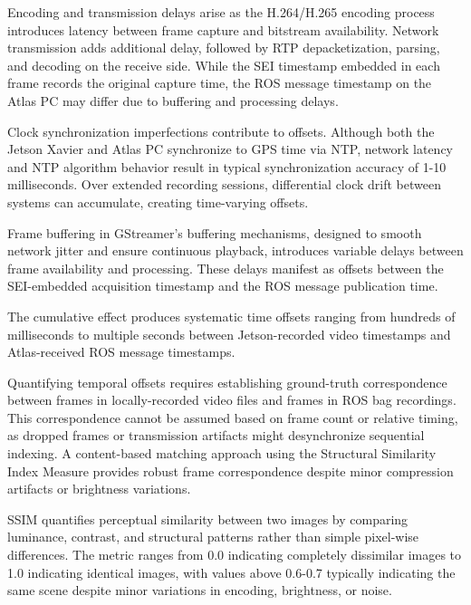 \documentclass{erauthesis}
\begin{document}
Encoding and transmission delays arise as the H.264/H.265 encoding process introduces latency between frame capture and bitstream availability.
Network transmission adds additional delay, followed by RTP depacketization, parsing, and decoding on the receive side.
While the SEI timestamp embedded in each frame records the original capture time, the ROS message timestamp on the Atlas PC may differ due to buffering and processing delays.

Clock synchronization imperfections contribute to offsets.
Although both the Jetson Xavier and Atlas PC synchronize to GPS time via NTP, network latency and NTP algorithm behavior result in typical synchronization accuracy of 1-10 milliseconds.
Over extended recording sessions, differential clock drift between systems can accumulate, creating time-varying offsets.

Frame buffering in GStreamer's buffering mechanisms, designed to smooth network jitter and ensure continuous playback, introduces variable delays between frame availability and processing.
These delays manifest as offsets between the SEI-embedded acquisition timestamp and the ROS message publication time.

The cumulative effect produces systematic time offsets ranging from hundreds of milliseconds to multiple seconds between Jetson-recorded video timestamps and Atlas-received ROS message timestamps.


Quantifying temporal offsets requires establishing ground-truth correspondence between frames in locally-recorded video files and frames in ROS bag recordings.
This correspondence cannot be assumed based on frame count or relative timing, as dropped frames or transmission artifacts might desynchronize sequential indexing.
A content-based matching approach using the Structural Similarity Index Measure provides robust frame correspondence despite minor compression artifacts or brightness variations.


SSIM quantifies perceptual similarity between two images by comparing luminance, contrast, and structural patterns rather than simple pixel-wise differences.
The metric ranges from 0.0 indicating completely dissimilar images to 1.0 indicating identical images, with values above 0.6-0.7 typically indicating the same scene despite minor variations in encoding, brightness, or noise.
\end{document}
